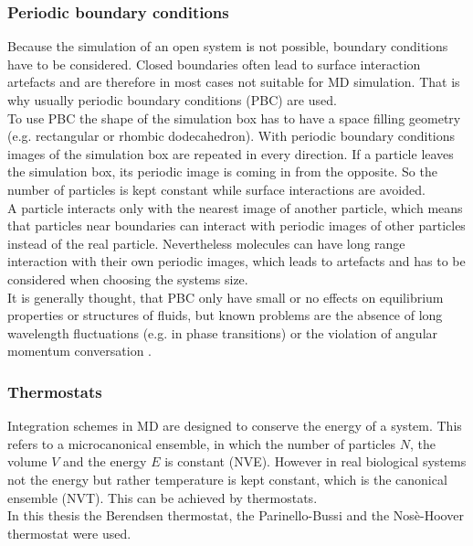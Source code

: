 \subsubsection{Periodic boundary conditions}
\label{subsec:pbc}
Because the simulation of an open system is not possible, boundary conditions have to be considered. Closed boundaries often lead to surface interaction artefacts and are therefore in most cases not suitable for MD simulation. That is why usually periodic boundary conditions (PBC) are used.\\
To use PBC the shape of the simulation box has to have a space filling geometry (e.g. rectangular or rhombic dodecahedron). With periodic boundary conditions images of the simulation box are repeated in every direction. If a particle leaves the simulation box, its periodic image is coming in from the opposite. So the number of particles is kept constant while surface interactions are avoided.\\
A particle interacts only with the nearest image of another particle, which means that particles near boundaries can interact with periodic images of other particles instead of the real particle. Nevertheless molecules can have long range interaction with their own periodic images, which leads to artefacts and has to be considered when choosing the systems size.\\
It is generally thought, that PBC only have small or no effects on equilibrium properties or structures of fluids, but known problems are the absence of long wavelength fluctuations (e.g. in phase transitions) or the violation of angular momentum conversation \autocite[p. 141f]{greenBook}.
\subsubsection{Thermostats}
Integration schemes in MD are designed to conserve the energy of a system. This refers to a microcanonical ensemble, in which the number of particles $N$, the volume $V$ and the energy $E$ is constant (NVE). However in real biological systems not the energy but rather temperature is kept constant, which is the canonical ensemble (NVT). This can be achieved by thermostats.\\
In this thesis the Berendsen thermostat, the Parinello-Bussi and the Nosè-Hoover thermostat were used.\\
